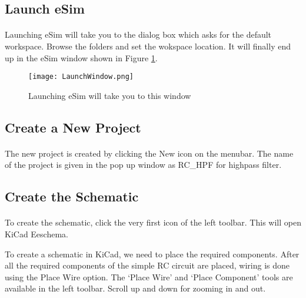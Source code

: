 \subsection{Launch eSim}

\paragraph{}
 Launching eSim will take you to the dialog box which asks for the default workspace. Browse the folders and set the wokspace location. It will finally end up in the eSim window shown in Figure \ref{LaunchWindow}.
\begin{figure}[h]
\centering
\texttt{[image: LaunchWindow.png]}
\caption{Launching eSim will take you to this window}
\label{LaunchWindow}
\end{figure}

\subsection{Create a New Project}

\paragraph{ } The new project is created by clicking the New icon on the
menubar. The name of the project is given in the pop up window as RC\_HPF for highpass filter.
\subsection{Create the Schematic}

\paragraph{}  To create the schematic, click the very first icon of the
left toolbar. This will open KiCad Eeschema.


To create a schematic in KiCad, we need to place the required components. After all the required components of the simple RC circuit are placed, wiring is
done using the Place Wire option. The `Place Wire' and `Place Component' tools are available in the left toolbar. Scroll up and down for zooming in and out.




